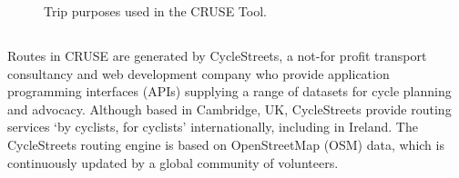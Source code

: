 \documentclass[
  super,
  preprint,
  3p]{elsarticle}
\providecommand{\DIFadd}[1]{{\protect\color{blue}\uwave{#1}}} %
\providecommand{\DIFaddbegin}{} %
\providecommand{\DIFaddend}{} %
\providecommand{\DIFdelbegin}{} %
\providecommand{\DIFdelend}{} %
\providecommand{\DIFaddbeginFL}{} %
\providecommand{\DIFaddendFL}{} %
\providecommand{\DIFdelbeginFL}{} %
\providecommand{\DIFdelendFL}{} %
\newcommand{\DIFscaledelfig}{0.5}
\newlength{\DIFdelgraphicswidth} %
\newlength{\DIFdelgraphicsheight} %
\newcommand{\DIFaddincludegraphics}[2][]{{\color{blue}\fbox{\DIFOincludegraphics[#1]{#2}}}} %
\newcommand{\DIFdelincludegraphics}[2][]{%
\sbox{\DIFdelgraphicsbox}{\DIFOincludegraphics[#1]{#2}}%
\settoboxwidth{\DIFdelgraphicswidth}{\DIFdelgraphicsbox} %
\settoboxtotalheight{\DIFdelgraphicsheight}{\DIFdelgraphicsbox} %
\scalebox{\DIFscaledelfig}{%
\parbox[b]{\DIFdelgraphicswidth}{\usebox{\DIFdelgraphicsbox}\\[-\baselineskip] \rule{\DIFdelgraphicswidth}{0em}}\llap{\resizebox{\DIFdelgraphicswidth}{\DIFdelgraphicsheight}{%
\setlength{\unitlength}{\DIFdelgraphicswidth}%
\begin{picture}(1,1)%
\thicklines\linethickness{2pt} %
{\color[rgb]{1,0,0}\put(0,0){\framebox(1,1){}}}%
{\color[rgb]{1,0,0}\put(0,0){\line( 1,1){1}}}%
{\color[rgb]{1,0,0}\put(0,1){\line(1,-1){1}}}%
\end{picture}%
}\hspace*{3pt}}} %
} %
\DeclareRobustCommand{\DIFaddbegin}{\DIFOaddbegin \let\includegraphics\DIFaddincludegraphics} %
\DeclareRobustCommand{\DIFaddend}{\DIFOaddend \let\includegraphics\DIFOincludegraphics} %
\DeclareRobustCommand{\DIFdelbegin}{\DIFOdelbegin \let\includegraphics\DIFdelincludegraphics} %
\DeclareRobustCommand{\DIFdelend}{\DIFOaddend \let\includegraphics\DIFOincludegraphics} %
\DeclareRobustCommand{\DIFaddbeginFL}{\DIFOaddbeginFL \let\includegraphics\DIFaddincludegraphics} %
\DeclareRobustCommand{\DIFaddendFL}{\DIFOaddendFL \let\includegraphics\DIFOincludegraphics} %
\DeclareRobustCommand{\DIFdelbeginFL}{\DIFOdelbeginFL \let\includegraphics\DIFdelincludegraphics} %
\DeclareRobustCommand{\DIFdelendFL}{\DIFOaddendFL \let\includegraphics\DIFOincludegraphics} %
\begin{document}
\begin{figure}

\DIFdelbeginFL %


\DIFdelendFL \DIFaddbeginFL {}
\DIFaddendFL 

\caption{\label{fig-trip-purposes}Trip purposes used in the CRUSE Tool.}

\end{figure}%

\DIFdelbegin %
\DIFdelend \DIFaddbegin \subsection{\DIFadd{Routing}}\label{routing}
\DIFaddend 

Routes in CRUSE are generated by CycleStreets, a not-for profit
transport consultancy and web development company who provide
application programming interfaces (APIs) supplying a range of datasets
for cycle planning and advocacy. Although based in Cambridge, UK,
CycleStreets provide routing services `by cyclists, for cyclists'
internationally, including in Ireland. The CycleStreets routing engine
is based on OpenStreetMap (OSM) data, which is continuously updated by a
global community of volunteers.
\end{document}
